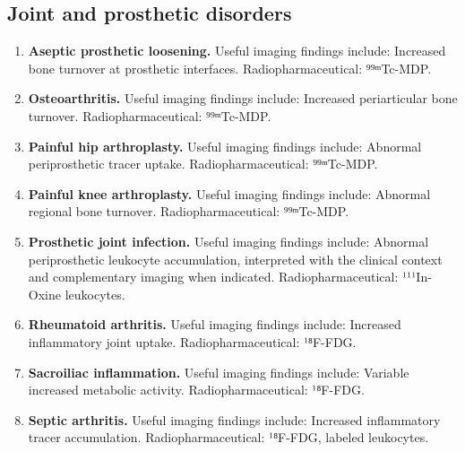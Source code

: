 \subsection{Joint and prosthetic disorders}
\begin{enumerate}[leftmargin=*,itemsep=0.45em,topsep=0.4em]
\item \textbf{Aseptic prosthetic loosening.} Useful imaging findings include: Increased bone turnover at prosthetic interfaces. Radiopharmaceutical: ⁹⁹ᵐTc-MDP.
\item \textbf{Osteoarthritis.} Useful imaging findings include: Increased periarticular bone turnover. Radiopharmaceutical: ⁹⁹ᵐTc-MDP.
\item \textbf{Painful hip arthroplasty.} Useful imaging findings include: Abnormal periprosthetic tracer uptake. Radiopharmaceutical: ⁹⁹ᵐTc-MDP.
\item \textbf{Painful knee arthroplasty.} Useful imaging findings include: Abnormal regional bone turnover. Radiopharmaceutical: ⁹⁹ᵐTc-MDP.
\item \textbf{Prosthetic joint infection.} Useful imaging findings include: Abnormal periprosthetic leukocyte accumulation, interpreted with the clinical context and complementary imaging when indicated. Radiopharmaceutical: ¹¹¹In-Oxine leukocytes.
\item \textbf{Rheumatoid arthritis.} Useful imaging findings include: Increased inflammatory joint uptake. Radiopharmaceutical: ¹⁸F-FDG.
\item \textbf{Sacroiliac inflammation.} Useful imaging findings include: Variable increased metabolic activity. Radiopharmaceutical: ¹⁸F-FDG.
\item \textbf{Septic arthritis.} Useful imaging findings include: Increased inflammatory tracer accumulation. Radiopharmaceutical: ¹⁸F-FDG, labeled leukocytes.
\end{enumerate}

